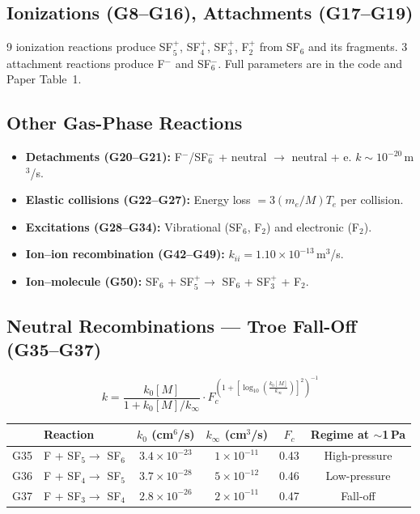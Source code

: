 \documentclass[11pt,a4paper]{article}
\begin{document}
\subsection{Ionizations (G8--G16), Attachments (G17--G19)}
9 ionization reactions produce SF$_5^+$, SF$_4^+$, SF$_3^+$, F$_2^+$ from SF$_6$ and its fragments. 3 attachment reactions produce F$^-$ and SF$_6^-$. Full parameters are in the code and Paper Table~1.

\subsection{Other Gas-Phase Reactions}
\begin{itemize}[nosep]
\item \textbf{Detachments (G20--G21):} F$^-$/SF$_6^-$ + neutral $\to$ neutral + e. $k \sim 10^{-20}$\,m$^3$/s.
\item \textbf{Elastic collisions (G22--G27):} Energy loss $= 3(m_e/M)T_e$ per collision.
\item \textbf{Excitations (G28--G34):} Vibrational (SF$_6$, F$_2$) and electronic (F$_2$).
\item \textbf{Ion--ion recombination (G42--G49):} $k_{ii} = 1.10\times10^{-13}$\,m$^3$/s.
\item \textbf{Ion--molecule (G50):} SF$_6$ + SF$_5^+ \to$ SF$_6$ + SF$_3^+$ + F$_2$.
\end{itemize}

\subsection{Neutral Recombinations --- Troe Fall-Off (G35--G37)}

\begin{equation}\label{eq:troe}
\boxed{k = \frac{k_0 [M]}{1 + k_0 [M] / k_\infty} \cdot F_c^{\left(1 + \left[\log_{10}\!\left(\frac{k_0[M]}{k_\infty}\right)\right]^2\right)^{-1}}}
\end{equation}

\begin{table}[H]
\centering
\begin{tabular}{clcccc}
\toprule
& \textbf{Reaction} & $k_0$ (cm$^6$/s) & $k_\infty$ (cm$^3$/s) & $F_c$ & \textbf{Regime at $\sim$1\,Pa} \\
\midrule
G35 & F + SF$_5 \to$ SF$_6$ & $3.4\times10^{-23}$ & $1\times10^{-11}$ & 0.43 & High-pressure \\
G36 & F + SF$_4 \to$ SF$_5$ & $3.7\times10^{-28}$ & $5\times10^{-12}$ & 0.46 & Low-pressure \\
G37 & F + SF$_3 \to$ SF$_4$ & $2.8\times10^{-26}$ & $2\times10^{-11}$ & 0.47 & Fall-off \\
\bottomrule
\end{tabular}
\end{table}
\end{document}
